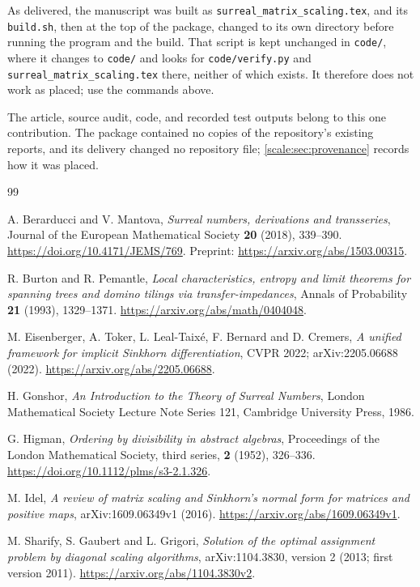\documentclass[11pt,a4paper]{article}
\numberwithin{equation}{section}
\theoremstyle{definition}
\begin{document}
As delivered, the manuscript was built as
\texttt{surreal\_matrix\_scaling.tex}, and its \texttt{build.sh}, then at the
top of the package, changed to its own directory before running the program
and the build. That script is kept unchanged in \texttt{code/}, where it
changes to \texttt{code/} and looks for \texttt{code/verify.py} and
\texttt{surreal\_matrix\_scaling.tex} there, neither of which exists. It
therefore does not work as placed; use the commands above.

The article, source audit, code, and recorded test outputs belong to
this one contribution. The package contained no copies of the
repository's existing reports, and its delivery changed no repository
file; \cref{scale:sec:provenance} records how it was placed.

\begin{thebibliography}{99}
\small
\raggedright
{}
A. Berarducci and V. Mantova,
\emph{Surreal numbers, derivations and transseries},
Journal of the European Mathematical Society \textbf{20} (2018),
339--390. \url{https://doi.org/10.4171/JEMS/769}.
Preprint: \url{https://arxiv.org/abs/1503.00315}.

R. Burton and R. Pemantle,
\emph{Local characteristics, entropy and limit theorems for spanning
trees and domino tilings via transfer-impedances},
Annals of Probability \textbf{21} (1993), 1329--1371.
\url{https://arxiv.org/abs/math/0404048}.

M. Eisenberger, A. Toker, L. Leal-Taix\'e, F. Bernard and D. Cremers,
\emph{A unified framework for implicit Sinkhorn differentiation},
CVPR 2022; arXiv:2205.06688 (2022).
\url{https://arxiv.org/abs/2205.06688}.

H. Gonshor, \emph{An Introduction to the Theory of Surreal Numbers},
London Mathematical Society Lecture Note Series 121,
Cambridge University Press, 1986.

G. Higman, \emph{Ordering by divisibility in abstract algebras},
Proceedings of the London Mathematical Society, third series,
\textbf{2} (1952), 326--336.
\url{https://doi.org/10.1112/plms/s3-2.1.326}.

M. Idel, \emph{A review of matrix scaling and Sinkhorn's normal form
for matrices and positive maps}, arXiv:1609.06349v1 (2016).
\url{https://arxiv.org/abs/1609.06349v1}.

M. Sharify, S. Gaubert and L. Grigori,
\emph{Solution of the optimal assignment problem by diagonal scaling
algorithms}, arXiv:1104.3830, version 2 (2013; first version 2011).
\url{https://arxiv.org/abs/1104.3830v2}.


\end{thebibliography}
\end{document}
